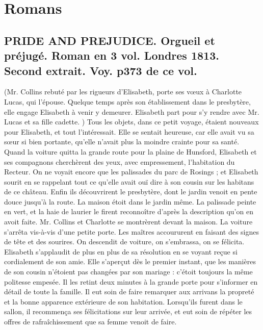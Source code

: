 \setcounter{page}{522}
\chapter{Romans}
\section{PRIDE AND PREJUDICE. Orgueil et préjugé. Roman en 3 vol. Londres 1813. \large{Second extrait. Voy. p373 de ce vol.}}
(Mr. Collins rebuté par les rigueurs d'Elisabeth, porte ses vœux à Charlotte Lucas, qui l'épouse. Quelque temps après son établissement dans le presbytère, elle engage Elisabeth à venir y demeurer. Elisabeth part pour s'y rendre avec Mr. Lucas et sa fille cadette. )
Tous les objets, dans ce petit voyage, étaient nouveaux pour Elisabeth, et tout l'intéressait. Elle se sentait heureuse, car elle avait vu sa sœur si bien portante, qu'elle n'avait plus la moindre crainte pour sa santé. Quand la voiture quitta la grande route pour la plaine de Hunsford, Elisabeth et ses compagnons cherchèrent des yeux, avec empressement, l'habitation du Recteur. On ne voyait encore que les palissades du parc de Rosings ; et Elisabeth sourit en se rappelant tout ce qu'elle avait ouï dire à son cousin sur les habitans de ce château.
Enfin ils découvrirent le presbytère, dont\setcounter{page}{523} le jardin venoit en pente douce jusqu'à la route. La maison étoit dans le jardin même. La palissade peinte en vert, et la haie de laurier le firent reconnoître d'après la description qu'on en avoit faite. Mr. Collins et Charlotte se montrèrent devant la maison. La voiture s'arrêta vis-à-vis d'une petite porte. Les maîtres accoururent en faisant des signes de tête et des sourires. On descendit de voiture, on s'embrassa, on se félicita. Elisabeth s'applaudit de plus en plus de sa résolution en se voyant reçue si cordialement de son amie. Elle s'aperçut dès le premier instant, que les manières de son cousin n'étoient pas changées par son mariage : c'étoit toujours la même politesse empesée. Il les retint deux minutes à la grande porte pour s'informer en détail de toute la famille. Il eut soin de faire remarquer aux arrivans la propreté et la bonne apparence extérieure de son habitation. Lorsqu'ils furent dans le sallon, il recommença ses félicitations sur leur arrivée, et eut soin de répéter les offres de rafraîchissement que sa femme venoit de faire.
